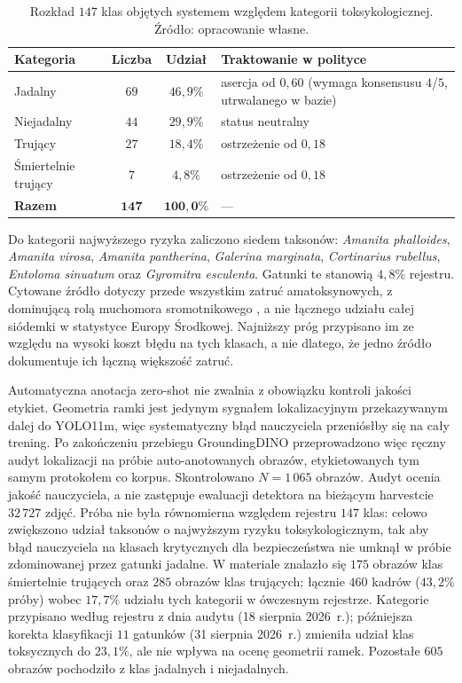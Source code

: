 \begin{table}[htbp]
 \centering
 \caption{Rozkład $147$ klas objętych systemem względem kategorii toksykologicznej. Źródło: opracowanie własne.}
 \label{tab:toksycznosc}
 \begin{tabular}{|l|c|c|p{5.6cm}|}
 \hline
 \textbf{Kategoria} & \textbf{Liczba} & \textbf{Udział} & \textbf{Traktowanie w polityce} \\
 \hline \hline
 Jadalny & $69$ & $46{,}9\%$ & asercja od $0{,}60$ (wymaga konsensusu $4$/$5$, utrwalanego w bazie) \\
 \hline
 Niejadalny & $44$ & $29{,}9\%$ & status neutralny \\
 \hline
 Trujący & $27$ & $18{,}4\%$ & ostrzeżenie od $0{,}18$ \\
 \hline
 Śmiertelnie trujący & $7$ & $4{,}8\%$ & ostrzeżenie od $0{,}18$ \\
 \hline \hline
 \textbf{Razem} & $\mathbf{147}$ & $\mathbf{100{,}0\%}$ & --- \\
 \hline
 \end{tabular}
\end{table}

Do kategorii najwyższego ryzyka zaliczono siedem taksonów: \textit{Amanita phalloides}, \textit{Amanita virosa}, \textit{Amanita pantherina}, \textit{Galerina marginata}, \textit{Cortinarius rubellus}, \textit{Entoloma sinuatum} oraz \textit{Gyromitra esculenta}. Gatunki te stanowią $4{,}8\%$ rejestru. Cytowane źródło dotyczy przede wszystkim zatruć amatoksynowych, z dominującą rolą muchomora sromotnikowego \cite{garcia2015amanita}, a nie łącznego udziału całej siódemki w statystyce Europy Środkowej. Najniższy próg przypisano im ze względu na wysoki koszt błędu na tych klasach, a nie dlatego, że jedno źródło dokumentuje ich łączną większość zatruć.

Automatyczna anotacja zero-shot nie zwalnia z obowiązku kontroli jakości etykiet. Geometria ramki jest jedynym sygnałem lokalizacyjnym przekazywanym dalej do YOLO11m, więc systematyczny błąd nauczyciela przeniósłby się na cały trening. Po zakończeniu przebiegu GroundingDINO przeprowadzono więc ręczny audyt lokalizacji na próbie auto-anotowanych obrazów, etykietowanych tym samym protokołem co korpus. Skontrolowano $N=1\,065$ obrazów. Audyt ocenia jakość nauczyciela, a nie zastępuje ewaluacji detektora na bieżącym harvestcie $32\,727$ zdjęć. Próba nie była równomierna względem rejestru $147$ klas: celowo zwiększono udział taksonów o najwyższym ryzyku toksykologicznym, tak aby błąd nauczyciela na klasach krytycznych dla bezpieczeństwa nie umknął w próbie zdominowanej przez gatunki jadalne. W materiale znalazło się $175$ obrazów klas śmiertelnie trujących oraz $285$ obrazów klas trujących; łącznie $460$ kadrów ($43{,}2\%$ próby) wobec $17{,}7\%$ udziału tych kategorii w ówczesnym rejestrze. Kategorie przypisano według rejestru z dnia audytu (18 sierpnia 2026~r.); późniejsza korekta klasyfikacji $11$ gatunków (31 sierpnia 2026~r.) zmieniła udział klas toksycznych do $23{,}1\%$, ale nie wpływa na ocenę geometrii ramek. Pozostałe $605$ obrazów pochodziło z klas jadalnych i niejadalnych.

